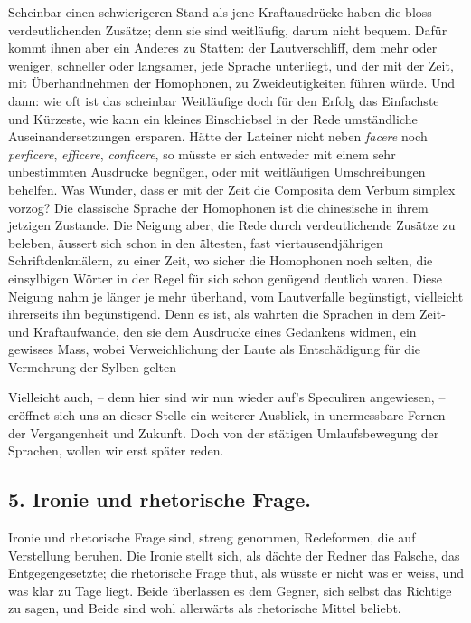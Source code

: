 {Scheinbar einen schwierigeren Stand als jene Kraftausdrücke haben die bloss verdeutlichenden Zusätze; denn sie sind weitläufig, darum nicht bequem. Dafür kommt ihnen aber ein Anderes zu Statten: der Lautverschliff, dem mehr oder weniger, schneller oder langsamer, jede Sprache unterliegt, und der mit der Zeit, mit Überhandnehmen der Homophonen, zu Zweideutigkeiten führen würde. Und dann: wie oft ist das scheinbar Weitläufige doch für den Erfolg das Einfachste und Kürzeste, wie kann ein kleines Einschiebsel in der Rede umständliche Auseinandersetzungen ersparen. Hätte der Lateiner nicht neben \textit{facere} noch \textit{perficere}, \textit{efficere}, \textit{conficere}, so müsste er sich entweder mit einem sehr unbestimmten Ausdrucke begnügen, oder mit weitläufigen Umschreibungen behelfen. Was Wunder, dass er mit der Zeit die Composita dem Verbum simplex vorzog? Die classische Sprache der Homophonen ist die chinesische in ihrem jetzigen Zustande. Die Neigung aber, die Rede durch verdeutlichende Zusätze zu beleben, äussert sich schon in den ältesten, fast viertausendjährigen Schriftdenkmälern, zu einer Zeit, wo sicher die Homophonen noch selten, die einsylbigen Wörter in der Regel für sich schon genügend deutlich waren. Diese Neigung nahm je länger je mehr überhand, vom Lautverfalle begünstigt, vielleicht ihrerseits ihn begünstigend. Denn es ist, als wahrten die Sprachen in dem Zeit- und Kraftaufwande, den sie dem Ausdrucke eines Gedankens widmen, ein gewisses Mass, wobei Verweichlichung der Laute als Entschädigung für die Vermehrung der Sylben gelten  

Vielleicht auch, – denn hier sind wir nun wieder auf’s Speculiren angewiesen, – eröffnet sich uns an dieser Stelle ein weiterer Ausblick, in unermessbare Fernen der Vergangenheit und Zukunft. Doch  von der stätigen Umlaufsbewegung der Sprachen, wollen wir erst später reden.

\label{sp.244}

\subsection*{5. Ironie und rhetorische Frage.}\label{III.II.II.12.5}
Ironie und rhetorische Frage sind, streng genommen, Redeformen, die auf Verstellung beruhen. Die Ironie stellt sich, als dächte der Redner das Falsche, das Entgegengesetzte; die rhetorische Frage thut, als wüsste er nicht was er weiss, und was klar zu Tage liegt. Beide überlassen es dem Gegner, sich selbst das Richtige zu sagen, und Beide sind wohl allerwärts als rhetorische Mittel beliebt.

}
